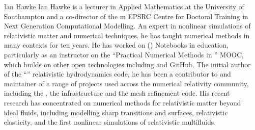 \begin{participant}[type=PI,gender=male]{Ian Hawke}
%
Ian Hawke is a lecturer in Applied Mathematics at the University of
Southampton and a co-director of the m EPSRC Centre for Doctoral
Training in Next Generation Computational Modelling. An expert in
nonlinear simulations of relativistic matter and numerical techniques,
he has taught numerical methods in many contexts for ten years. He has
worked on \IPython (\Jupyter{}) Notebooks in education, particularly as an
instructor on the ``Practical Numerical Methods in \Python'' MOOC,
which builds on other open technologies including  and GitHub. The
initial author of the ``'' relativistic hydrodynamics code, he has
been a contributor to and maintainer of a range of projects used
across the numerical relativity community, including the
, the  infrastructure and
the  mesh refinement
code. His recent research has concentrated on numerical methods for
relativistic matter beyond ideal fluids, including modelling sharp
transitions and surfaces, relativistic elasticity, and the first
nonlinear simulations of relativistic multifluids.
%
\end{participant}

